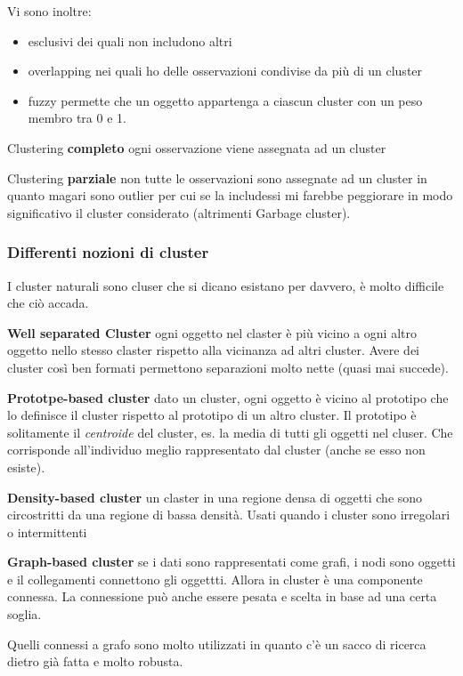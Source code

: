 Vi sono inoltre:
\begin{itemize}
	\item esclusivi dei quali non includono altri
	\item overlapping nei quali ho delle osservazioni condivise da pi\`u di un cluster
	\item fuzzy permette che un oggetto appartenga a ciascun cluster con un peso membro tra 0 e 1.
\end{itemize}

Clustering \textbf{completo} ogni osservazione viene assegnata ad un cluster

Clustering \textbf{parziale} non tutte le osservazioni sono assegnate ad un cluster in quanto magari sono outlier per cui se la includessi mi farebbe peggiorare in modo significativo il cluster considerato (altrimenti Garbage cluster).

\subsubsection{Differenti nozioni di cluster}
I cluster naturali sono cluser che si dicano esistano per davvero, \`e molto difficile che ci\`o accada.

\textbf{Well separated Cluster} ogni oggetto nel claster \`e pi\`u vicino a ogni altro oggetto nello stesso claster rispetto alla vicinanza ad altri cluster. Avere dei cluster cos\`i ben formati permettono separazioni molto nette (quasi mai succede).

\textbf{Prototpe-based cluster} dato un cluster, ogni oggetto \`e vicino al prototipo che lo definisce il cluster rispetto al prototipo di un altro cluster. Il prototipo \`e solitamente il \textit{centroide} del cluster, es. la media di tutti gli oggetti nel cluser. Che corrisponde all'individuo meglio rappresentato dal cluster (anche se esso non esiste). 

\textbf{Density-based cluster} un claster in una regione densa di oggetti che sono circostritti da una regione di bassa densit\`a. Usati quando i cluster sono irregolari o intermittenti

\textbf{Graph-based cluster} se i dati sono rappresentati come grafi, i nodi sono oggetti e il collegamenti connettono gli oggettti. Allora in cluster \`e una componente connessa. La connessione pu\`o anche essere pesata e scelta in base ad una certa soglia. 

Quelli connessi a grafo sono molto utilizzati in quanto c'\`e un sacco di ricerca dietro gi\`a fatta e molto robusta. 

